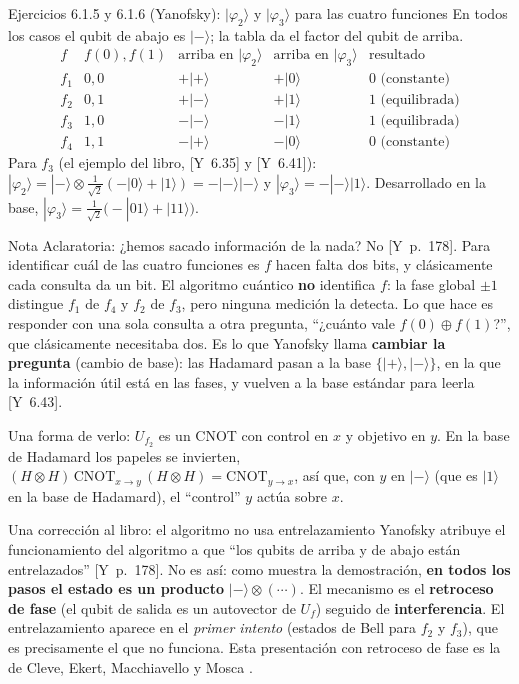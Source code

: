 \documentclass[11pt, a4paper, twoside, openright]{report}
\providecommand{\ket}[1]{|#1\rangle}
\newcommand{\Yan}[1]{\textcolor{rosaviejo}{\small[Y~#1]}}  %
\begin{document}
\begin{ejercicio}{Ejercicios 6.1.5 y 6.1.6 (Yanofsky): $\ket{\varphi_2}$ y $\ket{\varphi_3}$ para las cuatro funciones}
En todos los casos el qubit de abajo es $\ket{-}$; la tabla da el factor del qubit de arriba.
\[
\renewcommand{\arraystretch}{1.3}
\begin{array}{c|c|c|c|c}
f & f(0), f(1) & \text{arriba en } \ket{\varphi_2} & \text{arriba en } \ket{\varphi_3} & \text{resultado} \\ \hline
f_1 & 0, 0 & +\ket{+} & +\ket{0} & 0 \text{ (constante)} \\
f_2 & 0, 1 & +\ket{-} & +\ket{1} & 1 \text{ (equilibrada)} \\
f_3 & 1, 0 & -\ket{-} & -\ket{1} & 1 \text{ (equilibrada)} \\
f_4 & 1, 1 & -\ket{+} & -\ket{0} & 0 \text{ (constante)}
\end{array}
\]
Para $f_3$ (el ejemplo del libro, \Yan{6.35} y \Yan{6.41}): $\ket{\varphi_2} = \ket{-}\otimes\frac{1}{\sqrt2}(-\ket{0}+\ket{1}) = -\ket{-}\ket{-}$ y $\ket{\varphi_3} = -\ket{-}\ket{1}$. Desarrollado en la base, $\ket{\varphi_3} = \frac{1}{\sqrt2}\big(-\ket{01}+\ket{11}\big)$.
\end{ejercicio}

\begin{aclaracion}{Nota Aclaratoria: ¿hemos sacado información de la nada?}
No \Yan{p.~178}. Para identificar cuál de las cuatro funciones es $f$ hacen falta dos bits, y clásicamente cada consulta da un bit. El algoritmo cuántico \textbf{no} identifica $f$: la fase global $\pm1$ distingue $f_1$ de $f_4$ y $f_2$ de $f_3$, pero ninguna medición la detecta. Lo que hace es responder con una sola consulta a otra pregunta, ``¿cuánto vale $f(0)\oplus f(1)$?'', que clásicamente necesitaba dos. Es lo que Yanofsky llama \textbf{cambiar la pregunta} (cambio de base): las Hadamard pasan a la base $\{\ket{+},\ket{-}\}$, en la que la información útil está en las fases, y vuelven a la base estándar para leerla \Yan{6.43}.

Una forma de verlo: $U_{f_2}$ es un CNOT con control en $x$ y objetivo en $y$. En la base de Hadamard los papeles se invierten, $(H\otimes H)\,\mathrm{CNOT}_{x\to y}\,(H\otimes H) = \mathrm{CNOT}_{y\to x}$, así que, con $y$ en $\ket{-}$ (que es $\ket{1}$ en la base de Hadamard), el ``control'' $y$ actúa sobre $x$.
\end{aclaracion}

\begin{aclaracion}{Una corrección al libro: el algoritmo no usa entrelazamiento}
Yanofsky atribuye el funcionamiento del algoritmo a que ``los qubits de arriba y de abajo están entrelazados'' \Yan{p.~178}. No es así: como muestra la demostración, \textbf{en todos los pasos el estado es un producto} $\ket{-}\otimes(\cdots)$. El mecanismo es el \textbf{retroceso de fase} (el qubit de salida es un autovector de $U_f$) seguido de \textbf{interferencia}. El entrelazamiento aparece en el \textit{primer intento} (estados de Bell para $f_2$ y $f_3$), que es precisamente el que no funciona. Esta presentación con retroceso de fase es la de Cleve, Ekert, Macchiavello y Mosca \cite{cleve1998}.
\end{aclaracion}
\end{document}
